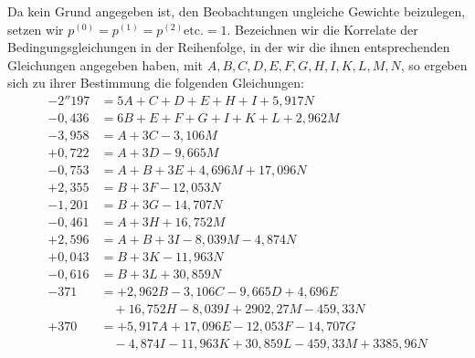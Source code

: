Da kein Grund angegeben ist, den Beobachtungen ungleiche Gewichte beizulegen, setzen wir \(p^{(0)}=p^{(1)}=p^{(2)}\text{etc.}=1\). Bezeichnen wir die Korrelate der Bedingungsgleichungen in der Reihenfolge, in der wir die ihnen entsprechenden Gleichungen angegeben haben, mit \(A,\allowbreak B,\allowbreak C,\allowbreak D,\allowbreak E,\allowbreak F,\allowbreak G,\allowbreak H,\allowbreak I,\allowbreak K,\allowbreak L,\allowbreak M,\allowbreak N\), so ergeben sich zu ihrer Bestimmung die folgenden Gleichungen:
\[
\begin{aligned}
-2''197&=5A+C+D+E+H+I+5{,}917N\\
-0{,}436&=6B+E+F+G+I+K+L+2{,}962M\\
-3{,}958&=A+3C-3{,}106M\\
+0{,}722&=A+3D-9{,}665M\\
-0{,}753&=A+B+3E+4{,}696M+17{,}096N\\
+2{,}355&=B+3F-12{,}053N\\
-1{,}201&=B+3G-14{,}707N\\
-0{,}461&=A+3H+16{,}752M\\
+2{,}596&=A+B+3I-8{,}039M-4{,}874N\\
+0{,}043&=B+3K-11{,}963N\\
-0{,}616&=B+3L+30{,}859N\\
-371&=+2{,}962B-3{,}106C-9{,}665D+4{,}696E\\
&\quad+16{,}752H-8{,}039I+2902{,}27M-459{,}33N\\
+370&=+5{,}917A+17{,}096E-12{,}053F-14{,}707G\\
&\quad-4{,}874I-11{,}963K+30{,}859L-459{,}33M+3385{,}96N
\end{aligned}
\]

